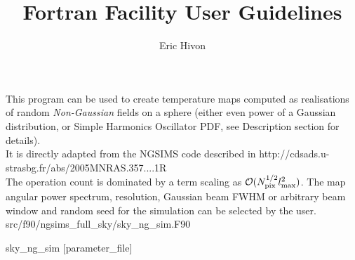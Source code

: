 
\sloppy


\title{\healpix Fortran Facility User Guidelines}
 \section[sky\_ng\_sim]{\nosectionname}
\label{fac:sky_ng_sim}
\author{Eric Hivon}

\begin{facility}
{This program can be used to create temperature \healpix maps computed as realisations 
of random {\em Non-Gaussian} fields on a sphere (either even power of a Gaussian
distribution, or Simple Harmonics Oscillator PDF, see Description section for
details). \\
It is directly adapted from the NGSIMS code described in 
%
{http://cdsads.u-strasbg.fr/abs/2005MNRAS.357....1R}%
\\
The operation count is dominated by a term scaling as
 ${\cal {O}}(N_{\mathrm{pix}}^{1/2} l_{\mathrm{max}}^2)$. 
The map angular power spectrum, resolution, Gaussian beam FWHM or arbitrary beam window  
and random seed for the simulation can be selected by the user.
}
{src/f90/ngsims\_full\_sky/sky\_ng\_sim.F90}
\end{facility}

\begin{f90facility}
{sky\_ng\_sim [parameter\_file]}
\end{f90facility}


